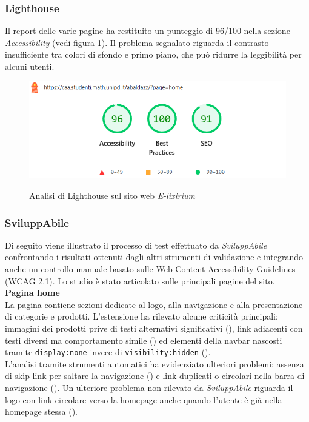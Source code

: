 \subsubsection{Lighthouse}
\noindent Il report delle varie pagine ha restituito un punteggio di 96/100 nella sezione \textit{Accessibility} (vedi figura \ref{fig:Lighthouse_elixirium}). 
Il problema segnalato riguarda il contrasto insufficiente tra colori di sfondo e primo piano, che può ridurre la leggibilità per alcuni utenti. 
\begin{figure}[H]
    \centering
    \includegraphics[width=0.6\linewidth, alt={Screenshot dell'analisi di Lighthouse sul sito web E-lixirium}]{img/Lighthouse_elixirium.png}
    \caption{Analisi di Lighthouse sul sito web \textit{E-lixirium}}\label{fig:Lighthouse_elixirium}
\end{figure}

\subsubsection{SviluppAbile}
\noindent Di seguito viene illustrato il processo di test effettuato da \textit{SviluppAbile} confrontando i risultati ottenuti dagli altri strumenti di validazione e integrando anche un controllo manuale basato sulle Web Content Accessibility Guidelines (WCAG 2.1). Lo studio è stato articolato sulle principali pagine del sito.\\

\noindent \textbf{Pagina home}\\
La pagina contiene sezioni dedicate al logo, alla navigazione e alla presentazione di categorie e prodotti. L’estensione ha rilevato alcune criticità principali: immagini dei prodotti prive di testi alternativi significativi ({}), link adiacenti con testi diversi ma comportamento simile ({}) ed elementi della navbar nascosti tramite \texttt{display:none} invece di \texttt{visibility:hidden} ({}).\\
L’analisi tramite strumenti automatici ha evidenziato ulteriori problemi: assenza di skip link per saltare la navigazione ({}) e link duplicati o circolari nella barra di navigazione ({}). Un ulteriore problema non rilevato da \textit{SviluppAbile} riguarda il logo con link circolare verso la homepage anche quando l’utente è già nella homepage stessa ({}).\\

